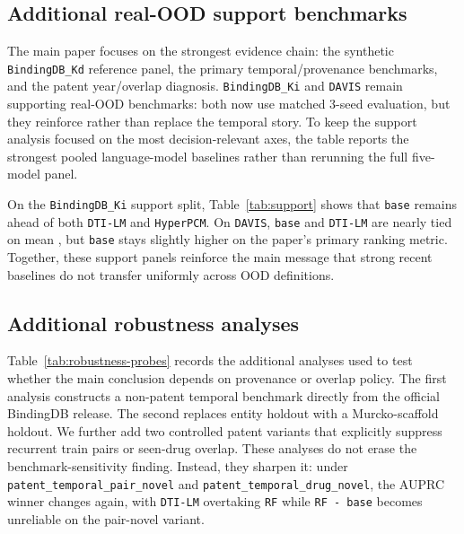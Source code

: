 

\subsection{Additional real-OOD support benchmarks}

The main paper focuses on the strongest evidence chain: the synthetic \texttt{BindingDB\_Kd} reference panel, the primary temporal/provenance benchmarks, and the patent year/overlap diagnosis. \texttt{BindingDB\_Ki} and \texttt{DAVIS} remain supporting real-OOD benchmarks: both now use matched 3-seed evaluation, but they reinforce rather than replace the temporal story. To keep the support analysis focused on the most decision-relevant axes, the table reports the strongest pooled language-model baselines rather than rerunning the full five-model panel.



On the \texttt{BindingDB\_Ki} support split, Table~\ref{tab:support} shows that \texttt{base} remains ahead of both \texttt{DTI-LM} and \texttt{HyperPCM}. On \texttt{DAVIS}, \texttt{base} and \texttt{DTI-LM} are nearly tied on mean \AUPRC{}, but \texttt{base} stays slightly higher on the paper's primary ranking metric. Together, these support panels reinforce the main message that strong recent baselines do not transfer uniformly across OOD definitions.

\subsection{Additional robustness analyses}

Table~\ref{tab:robustness-probes} records the additional analyses used to test whether the main conclusion depends on provenance or overlap policy. The first analysis constructs a non-patent temporal benchmark directly from the official BindingDB release. The second replaces entity holdout with a Murcko-scaffold holdout. We further add two controlled patent variants that explicitly suppress recurrent train pairs or seen-drug overlap. These analyses do not erase the benchmark-sensitivity finding. Instead, they sharpen it: under \texttt{patent\_temporal\_pair\_novel} and \texttt{patent\_temporal\_drug\_novel}, the AUPRC winner changes again, with \texttt{DTI-LM} overtaking \texttt{RF} while \texttt{RF - base} becomes unreliable on the pair-novel variant.



